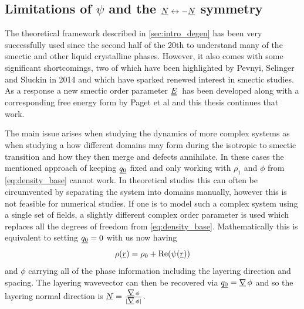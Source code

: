 \documentclass[12pt]{article}
\newcommand{\suf}[2]{\stackunder[0.5pt]{\stackunder[1pt]{\ensuremath{#1}}{\rule{\widthof{\ensuremath{#2}}*\real{0.9}}{.1ex}}}{}}
\newcommand{\duf}[2]{\stackunder[0.5pt]{\stackunder[0.8pt]{\stackunder[1pt]{\ensuremath{#1}}{\rule{\widthof{\ensuremath{#2}}*\real{0.9}}{.1ex}}}{\rule{\widthof{\ensuremath{#2}}*\real{0.9}}{.1ex}}}{}}
\newcommand{\su}[1]{\suf{#1}{#1}}
\newcommand{\du}[1]{\duf{#1}{#1}}
\newcommand{\mgrad}{\ensuremath{\suf{\nabla}{K}\,}}
\newcommand{\EE}{\ensuremath{\du{E}}}
\begin{document}
    \subsection{Limitations of $\psi$ and the $\su{N} \leftrightarrow -\su{N}$ symmetry}\label{sec:intro_pevnyi}
        The theoretical framework described in \cref{sec:intro_degen} has been very successfully used since the second half of the 20th to understand many of the smectic and other liquid crystalline phases.
        However, it also comes with some significant shortcomings, two of which have been highlighted by Pevnyi, Selinger and Sluckin in 2014\cite{pevnyiModelingSmecticLayers2014} and which have sparked renewed interest in smectic studies.
        As a response a new smectic order parameter \EE\ has been developed along with a corresponding free energy form by Paget et al\cite{pagetComplexTensorsSimple2023,pagetSmecticLayeringLandau2022,pagetComplextensorTheorySimple2023} and this thesis continues that work.

        The main issue arises when studying the dynamics of more complex systems as when studying a how different domains may form during the isotropic to smectic transition and how they then merge and defects annihilate\cite{ambrozicAnnihilationEdgeDislocations2004,abukhdeirDefectKineticsDynamics2008}.
        In these cases the mentioned approach of keeping $\su{q_0}$ fixed and only working with $\rho_1$ and $\phi$ from \cref{eq:density_base} cannot work.
        In theoretical studies this can often be circumvented by separating the system into domains manually, however this is not feasible for numerical studies.
        If one is to model such a complex system using a single set of fields, a slightly different complex order parameter is used which replaces all the degrees of freedom from \cref{eq:density_base}\cite{mukherjeeSimpleLandauModel2001,mukherjeeAdvancesIsotropicSmectic2021}.
        Mathematically this is equivalent to setting $\su{q_0} = 0$ with us now having
        \begin{equation}\label{eq:density_pevnyi}
            \rho(\su{r}) = \rho_0 + \Re(\psi(\su{r}))
        \end{equation}
        and $\phi$ carrying all of the phase information including the layering direction and spacing.
        The layering wavevector can then be recovered via $\su{q_0} = \mgrad \phi$ and so the layering normal direction is $\su{N} = \frac{\mgrad \phi}{|\mgrad \phi|}$.
\end{document}
